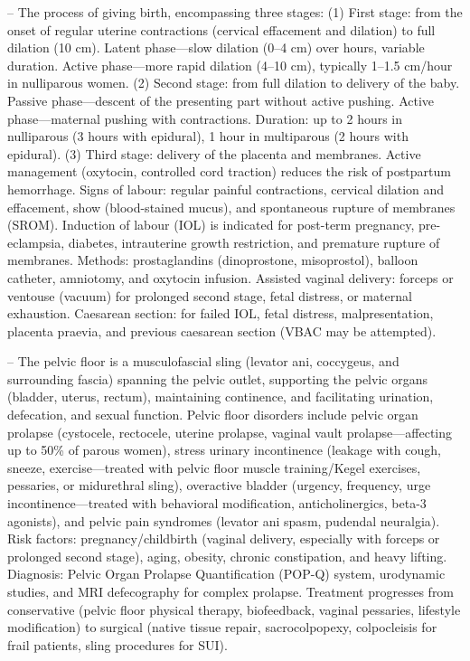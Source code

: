 -- The process of giving birth, encompassing three stages: (1) First stage: from the onset of regular uterine contractions (cervical effacement and dilation) to full dilation (10 cm). Latent phase—slow dilation (0--4 cm) over hours, variable duration. Active phase—more rapid dilation (4--10 cm), typically 1--1.5 cm/hour in nulliparous women. (2) Second stage: from full dilation to delivery of the baby. Passive phase—descent of the presenting part without active pushing. Active phase—maternal pushing with contractions. Duration: up to 2 hours in nulliparous (3 hours with epidural), 1 hour in multiparous (2 hours with epidural). (3) Third stage: delivery of the placenta and membranes. Active management (oxytocin, controlled cord traction) reduces the risk of postpartum hemorrhage. Signs of labour: regular painful contractions, cervical dilation and effacement, show (blood-stained mucus), and spontaneous rupture of membranes (SROM). Induction of labour (IOL) is indicated for post-term pregnancy, pre-eclampsia, diabetes, intrauterine growth restriction, and premature rupture of membranes. Methods: prostaglandins (dinoprostone, misoprostol), balloon catheter, amniotomy, and oxytocin infusion. Assisted vaginal delivery: forceps or ventouse (vacuum) for prolonged second stage, fetal distress, or maternal exhaustion. Caesarean section: for failed IOL, fetal distress, malpresentation, placenta praevia, and previous caesarean section (VBAC may be attempted).

-- The pelvic floor is a musculofascial sling (levator ani, coccygeus, and surrounding fascia) spanning the pelvic outlet, supporting the pelvic organs (bladder, uterus, rectum), maintaining continence, and facilitating urination, defecation, and sexual function. Pelvic floor disorders include pelvic organ prolapse (cystocele, rectocele, uterine prolapse, vaginal vault prolapse—affecting up to 50\% of parous women), stress urinary incontinence (leakage with cough, sneeze, exercise—treated with pelvic floor muscle training/Kegel exercises, pessaries, or midurethral sling), overactive bladder (urgency, frequency, urge incontinence—treated with behavioral modification, anticholinergics, beta-3 agonists), and pelvic pain syndromes (levator ani spasm, pudendal neuralgia). Risk factors: pregnancy/childbirth (vaginal delivery, especially with forceps or prolonged second stage), aging, obesity, chronic constipation, and heavy lifting. Diagnosis: Pelvic Organ Prolapse Quantification (POP-Q) system, urodynamic studies, and MRI defecography for complex prolapse. Treatment progresses from conservative (pelvic floor physical therapy, biofeedback, vaginal pessaries, lifestyle modification) to surgical (native tissue repair, sacrocolpopexy, colpocleisis for frail patients, sling procedures for SUI).

